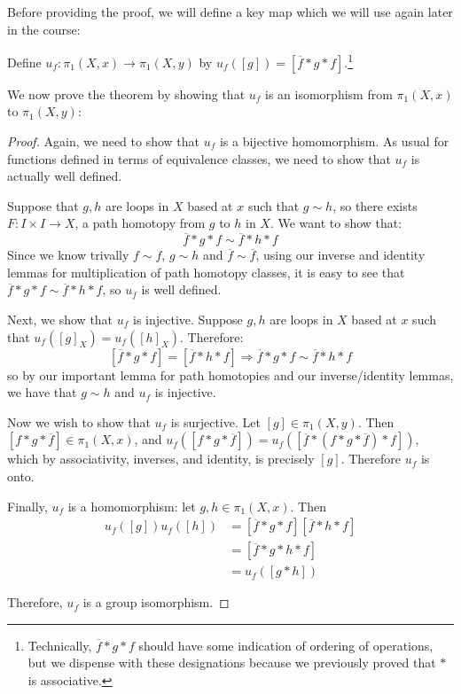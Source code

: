 Before providing the proof, we will define a key map which we will use again later in the course:
\begin{definition}
Define $u_f:\pi_1(X,x)\to \pi_1(X,y)$ by $u_f([g]) = [\overline{f}*g*f]$.\footnote{Technically, $\overline{f}*g*f$ should have some indication of ordering of operations, but we dispense with these designations because we previously proved that $*$ is associative.}
\end{definition}
We now prove the theorem by showing that $u_f$ is an isomorphism from $\pi_1(X,x)$ to $\pi_1(X,y)$:
\begin{proof}
Again, we need to show that $u_f$ is a bijective homomorphism. As usual for functions defined in terms of equivalence classes, we need to show that $u_f$ is actually well defined. 

Suppose that $g,h$ are loops in $X$ based at $x$ such that $g\sim h$, so there exists $F:I\times I\to X$, a path homotopy from $g$ to $h$ in $X$. We want to show that:
\[\overline{f}*g*f \sim \overline{f}*h*f\]
Since we know trivally $f\sim f$, $g\sim h$ and $\overline{f}\sim\overline{f}$, using our inverse and identity lemmas for multiplication of path homotopy classes, it is easy to see that $\overline{f}*g*f \sim \overline{f}*h*f$, so $u_f$ is well defined.

Next, we show that $u_f$ is injective. Suppose $g,h$ are loops in $X$ based at $x$ such that $u_f([g]_X) = u_f([h]_X)$. Therefore:
\[[\overline{f}*g*f] = [\overline{f}*h*f] \Rightarrow \overline{f}*g*f\sim \overline{f}*h*f\]
so by our important lemma for path homotopies and our inverse/identity lemmas, we have that $g\sim h$ and $u_f$ is injective.

Now we wish to show that $u_f$ is surjective. Let $[g]\in \pi_1(X,y)$.  Then $[f*g*\overline{f}]\in \pi_1(X,x)$, and $u_f([f*g*\overline{f}])=u_f([\overline{f}*(f*g*\overline{f})*f])$, which by associativity, inverses, and identity, is precisely $[g]$.  Therefore $u_f$ is onto.

Finally, $u_f$ is a homomorphism:  let $g,h\in \pi_1(X,x)$.  Then 
\begin{align*}
u_f([g])u_f([h])	& = [\overline{f}*g*f][\overline{f}*h*f] \\ 
			& = [\overline{f}*g*h*f] \\
			&= u_f([g*h])
\end{align*}

Therefore, $u_f$ is a group isomorphism.
\end{proof}

